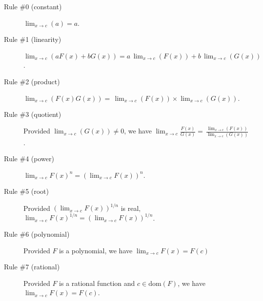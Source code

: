 \documentclass[12pt,fleqn,answers]{exam}
\newcommand{\dom}{\mbox{dom}}
\begin{document}
\begin{description}

\item[Rule \#0 (constant)] $  \displaystyle \lim_{x \to c} (a) = a$.
 
\item[Rule \#1 (linearity)] $ \displaystyle \lim_{x \to c} (a F(x) + b G(x)) = a  \, \lim_{x \to c} (F(x)) + b \, \lim_{x \to c} (G(x)) $.

\item [Rule \#2 (product)]$ \displaystyle \lim_{x \to c} (F(x)  G(x)) = \, \lim_{x \to c} (F(x))  \times \lim_{x \to c} (G(x)) $.

\item [Rule \#3 (quotient)] Provided $\displaystyle  \lim_{x \to c} (G(x)) \neq 0$, we have $\displaystyle \lim_{x \to c} \frac{F(x)}{G(x)} = \, \frac{\lim_{x \to c} (F(x))}{ \lim_{x \to c} (G(x)) } $.

\item [Rule \#4 (power)]  $ \displaystyle \lim_{x \to c} F(x)^n  = \left(\lim_{x \to c} F(x) \right)^n  $.

\item [Rule \#5 (root)]  Provided $ \displaystyle  \left(\lim_{x \to c} F(x) \right)^{1/n} $ is real,  $ \displaystyle \lim_{x \to c} F(x)^{1/n}  = \left(\lim_{x \to c} F(x) \right)^{1/n}  $.

\item [Rule \#6 (polynomial)]  Provided $F$ is a polynomial, we have  $ \displaystyle \lim_{x \to c} F(x) = F(c)$

 \item [Rule \#7 (rational)]  Provided $F$ is a rational function and $c \in \dom(F)$, we have  \mbox{$ \displaystyle \lim_{x \to c} F(x) = F(c)$.}
\end{description}
\end{document}
